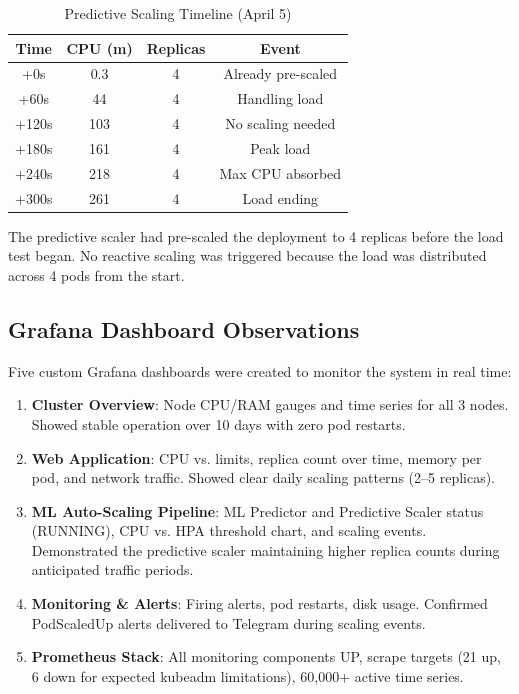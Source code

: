 \documentclass[journal]{IEEEtran}
\begin{document}
\begin{table}[h]
\centering
\caption{Predictive Scaling Timeline (April 5)}
\label{tab:after}
\begin{tabular}{@{}cccc@{}}
\toprule
\textbf{Time} & \textbf{CPU (m)} & \textbf{Replicas} & \textbf{Event} \\
\midrule
+0s & 0.3 & 4 & Already pre-scaled \\
+60s & 44 & 4 & Handling load \\
+120s & 103 & 4 & No scaling needed \\
+180s & 161 & 4 & Peak load \\
+240s & 218 & 4 & Max CPU absorbed \\
+300s & 261 & 4 & Load ending \\
\bottomrule
\end{tabular}
\end{table}

The predictive scaler had pre-scaled the deployment to 4 replicas before the load test began. No reactive scaling was triggered because the load was distributed across 4 pods from the start.

\subsection{Grafana Dashboard Observations}
Five custom Grafana dashboards were created to monitor the system in real time:

\begin{enumerate}
    \item \textbf{Cluster Overview}: Node CPU/RAM gauges and time series for all 3 nodes. Showed stable operation over 10 days with zero pod restarts.
    \item \textbf{Web Application}: CPU vs. limits, replica count over time, memory per pod, and network traffic. Showed clear daily scaling patterns (2--5 replicas).
    \item \textbf{ML Auto-Scaling Pipeline}: ML Predictor and Predictive Scaler status (RUNNING), CPU vs. HPA threshold chart, and scaling events. Demonstrated the predictive scaler maintaining higher replica counts during anticipated traffic periods.
    \item \textbf{Monitoring \& Alerts}: Firing alerts, pod restarts, disk usage. Confirmed PodScaledUp alerts delivered to Telegram during scaling events.
    \item \textbf{Prometheus Stack}: All monitoring components UP, scrape targets (21 up, 6 down for expected kubeadm limitations), 60,000+ active time series.
\end{enumerate}
\end{document}
